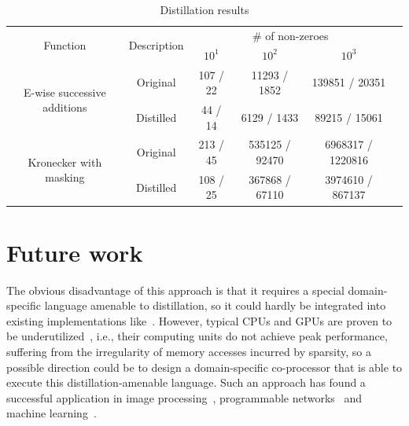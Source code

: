 \documentclass[acmsmall,review,nonacm]{acmart}\settopmatter{printfolios=true,printccs=false,printacmref=false}
\begin{document}

\begin{table}[t]
    \centering
    \begin{tabular}{ |c|c|c|c|c|c| } 
\hline
\multirow{2}{10em}{Function} & \multirow{2}{5em}{Description} & \multicolumn{3}{c}{\# of non-zeroes}\vline\\
\cline{3-5}
{}&{} & $10^1$ & $10^2$ & $10^3$ \\
\hline
\multirow{2}{10em}{E-wise successive additions} & Original & 107 / 22 & 11293 / 1852 & 139851 / 20351\\ 
& Distilled & 44 / 14 & 6129 / 1433 & 89215 / 15061\\
\hline
\multirow{2}{10em}{Kronecker with masking} & Original & 213 / 45 & 535125 / 92470 & 6968317 / 1220816\\ 
& Distilled & 108 / 25 & 367868 / 67110 & 3974610 / 867137\\
\hline
\end{tabular}
    \caption{Distillation results}
    \label{tab:table_distill}
\end{table}




\section{Future work}

The obvious disadvantage of this approach is that it requires a special domain-specific language amenable to distillation, so it could hardly be integrated into existing implementations like~\cite{SuiteSparse, yang2020graphblast}. However, typical CPUs and GPUs are proven to be underutilized~\cite{Florida,leskovec2016snap,Song_2016,zhang2020sparch}, i.e., their computing units do not achieve peak performance, suffering from the irregularity of memory accesses incurred by sparsity, so a possible direction could be to design a domain-specific co-processor that is able to execute this distillation-amenable language. Such an approach has found a successful application in image processing~\cite{halide,redgrave2018pixel}, programmable networks~\cite{barefoot} and machine learning~\cite{GoogleTPU,TensorFlowXLA}.
\end{document}
